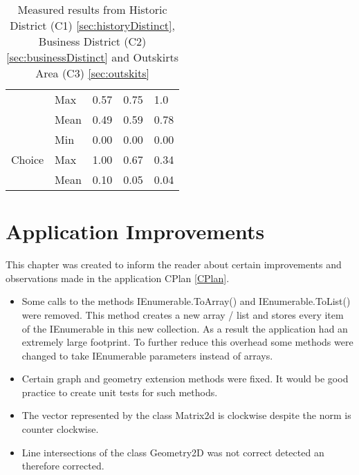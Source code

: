 \begin{table}[h]
\begin{center}
\begin{tabular}{ |l|l|l|l|l| }
            & Max & 0.57 & 0.75 & 1.0 \\
            & Mean & 0.49 & 0.59 & 0.78 \\
            \hline
            \multirow{5}{*}{Choice}
            & Min & 0.00 & 0.00 & 0.00 \\
            & Max & 1.00 & 0.67 & 0.34 \\
            & Mean & 0.10 & 0.05 & 0.04 \\
            \hline
        \end{tabular}
        \caption{Measured results from Historic District (C1) \ref{sec:historyDistinct}, Business District (C2) \ref{sec:businessDistinct} and Outskirts Area (C3) \ref{sec:outskits}}
    \end{center}
\end{table}

\pagebreak
\section{Application Improvements}
This chapter was created to inform the reader about certain improvements and observations made in the application CPlan \ref{CPlan}.
\begin{itemize}
    \item Some calls to the methods IEnumerable.ToArray() and IEnumerable.ToList() were removed. This method creates a new array / list and stores every item of the IEnumerable in this new collection. As a result the application had an extremely large footprint. To further reduce this overhead some methods were changed to take IEnumerable parameters instead of arrays.
    \item Certain graph and geometry extension methods were fixed. It would be good practice to create unit tests for such methods.
    \item The vector represented by the class Matrix2d is clockwise despite the norm is counter clockwise.
    \item Line intersections of the class Geometry2D was not correct detected an therefore corrected.
\end{itemize}
